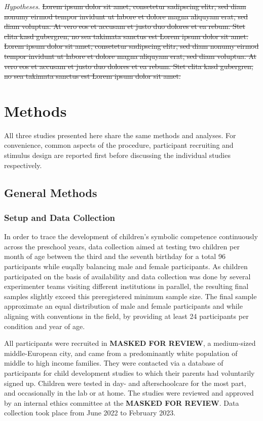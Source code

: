 \documentclass[
  man]{apa6}
\begin{document}
\emph{Hypotheses}. \st{Lorem ipsum dolor sit amet, consetetur sadipscing elitr, sed diam nonumy eirmod tempor invidunt ut labore et dolore magna aliquyam erat, sed diam voluptua. At vero eos et accusam et justo duo dolores et ea rebum. Stet clita kasd gubergren, no sea takimata sanctus est Lorem ipsum dolor sit amet. Lorem ipsum dolor sit amet, consetetur sadipscing elitr, sed diam nonumy eirmod tempor invidunt ut labore et dolore magna aliquyam erat, sed diam voluptua. At vero eos et accusam et justo duo dolores et ea rebum. Stet clita kasd gubergren, no sea takimata sanctus est Lorem ipsum dolor sit amet.}

\section{Methods}\label{methods}

All three studies presented here share the same methods and analyses. For convenience, common aspects of the procedure, participant recruiting and stimulus design are reported first before discussing the individual studies respectively.

\subsection{General Methods}\label{general-methods}

\subsubsection{Setup and Data Collection}\label{setup-and-data-collection}

In order to trace the development of children's symbolic competence continuously across the preschool years, data collection aimed at testing two children per month of age between the third and the seventh birthday for a total 96 participants while euqally balancing male and female participants. As children participated on the basis of availability and data collection was done by several experimenter teams visiting different institutions in parallel, the resulting final samples slightly exceed this preregistered minimum sample size. The final sample approximate an equal distribution of male and female participants and
while aligning with conventions in the field, by providing at least 24 participants per condition and year of age.

All participants were recruited in \textbf{MASKED FOR REVIEW}, a medium-sized middle-European city, and came from a predominantly white population of middle to high income families. They were contacted via a database of participants for child development studies to which their parents had voluntarily signed up. Children were tested in day- and afterschoolcare for the most part, and occasionally in the lab or at home. The studies were reviewed and approved by an internal ethics committee at the \textbf{MASKED FOR REVIEW}. Data collection took place from June 2022 to February 2023.
\end{document}
